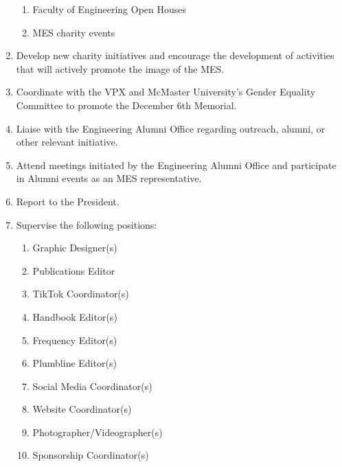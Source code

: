\begin{enumerate}
  \begin{enumerate}
   \item
    Faculty of Engineering Open Houses
   \item
    MES charity events
  \end{enumerate}
 \item
  Develop new charity initiatives and encourage the development of activities that will actively promote the image of the MES.
 \item
  Coordinate with the VPX and McMaster University's Gender Equality Committee to promote the December 6th Memorial.
 \item
  Liaise with the Engineering Alumni Office regarding outreach, alumni, or other relevant initiative.
 \item
  Attend meetings initiated by the Engineering Alumni Office and participate in Alumni events as an MES representative.
 \item
  Report to the President.
 \item
  Supervise the following positions:

  \begin{enumerate}
   \item
    Graphic Designer(s)
   \item
    Publications Editor
   \item
    TikTok Coordinator(s)
   \item
    Handbook Editor(s)
   \item
    Frequency Editor(s)
   \item
    Plumbline Editor(s)
   \item
    Social Media Coordinator(s)
   \item
    Website Coordinator(s)
   \item
    Photographer/Videographer(s)
   \item
    Sponsorship Coordinator(s)
  \end{enumerate}

\end{enumerate}